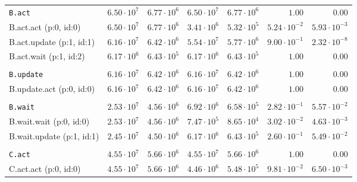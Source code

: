 \begin{table}[htbp]
{\begin{tabular}{lrrrrrr}
\\[-8pt]\texttt{B.act}                & $6.50 \cdot 10^{7}$ & $6.77 \cdot 10^{6}$ & $6.50 \cdot 10^{7}$ & $6.77 \cdot 10^{6}$ &               $1.00$ &               $0.00$ \\
\hspace{3mm}B.act.act (p:0, id:0)     & $6.50 \cdot 10^{7}$ & $6.77 \cdot 10^{6}$ & $3.41 \cdot 10^{6}$ & $5.32 \cdot 10^{5}$ & $5.24 \cdot 10^{-2}$ & $5.93 \cdot 10^{-3}$ \\
\hspace{3mm}B.act.update (p:1, id:1)  & $6.16 \cdot 10^{7}$ & $6.42 \cdot 10^{6}$ & $5.54 \cdot 10^{7}$ & $5.77 \cdot 10^{6}$ & $9.00 \cdot 10^{-1}$ & $2.32 \cdot 10^{-8}$ \\
\hspace{3mm}B.act.wait (p:1, id:2)    & $6.17 \cdot 10^{6}$ & $6.43 \cdot 10^{5}$ & $6.17 \cdot 10^{6}$ & $6.43 \cdot 10^{5}$ &               $1.00$ &               $0.00$ \\
\\[-8pt]\texttt{B.update}             & $6.16 \cdot 10^{7}$ & $6.42 \cdot 10^{6}$ & $6.16 \cdot 10^{7}$ & $6.42 \cdot 10^{6}$ &               $1.00$ &               $0.00$ \\
\hspace{3mm}B.update.act (p:0, id:0)  & $6.16 \cdot 10^{7}$ & $6.42 \cdot 10^{6}$ & $6.16 \cdot 10^{7}$ & $6.42 \cdot 10^{6}$ &               $1.00$ &               $0.00$ \\
\\[-8pt]\texttt{B.wait}               & $2.53 \cdot 10^{7}$ & $4.56 \cdot 10^{6}$ & $6.92 \cdot 10^{6}$ & $6.58 \cdot 10^{5}$ & $2.82 \cdot 10^{-1}$ & $5.57 \cdot 10^{-2}$ \\
\hspace{3mm}B.wait.wait (p:0, id:0)   & $2.53 \cdot 10^{7}$ & $4.56 \cdot 10^{6}$ & $7.47 \cdot 10^{5}$ & $8.65 \cdot 10^{4}$ & $3.02 \cdot 10^{-2}$ & $4.63 \cdot 10^{-3}$ \\
\hspace{3mm}B.wait.update (p:1, id:1) & $2.45 \cdot 10^{7}$ & $4.50 \cdot 10^{6}$ & $6.17 \cdot 10^{6}$ & $6.43 \cdot 10^{5}$ & $2.60 \cdot 10^{-1}$ & $5.49 \cdot 10^{-2}$ \\
\\[-8pt]\texttt{C.act}                & $4.55 \cdot 10^{7}$ & $5.66 \cdot 10^{6}$ & $4.55 \cdot 10^{7}$ & $5.66 \cdot 10^{6}$ &               $1.00$ &               $0.00$ \\
\hspace{3mm}C.act.act (p:0, id:0)     & $4.55 \cdot 10^{7}$ & $5.66 \cdot 10^{6}$ & $4.46 \cdot 10^{6}$ & $5.48 \cdot 10^{5}$ & $9.81 \cdot 10^{-2}$ & $6.50 \cdot 10^{-3}$ \\

\end{tabular}}
\end{table}
